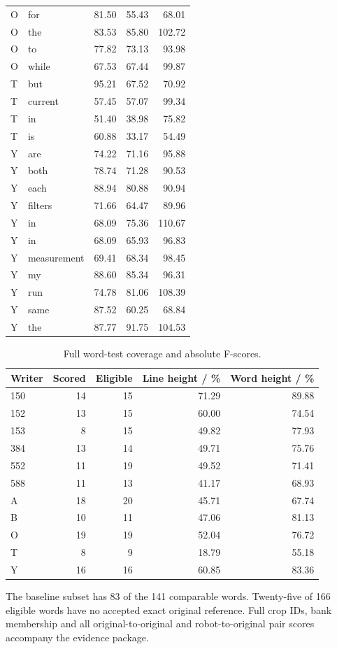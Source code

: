 \begin{longtable}{llrrr}
O & for & 81.50 & 55.43 & 68.01\\
O & the & 83.53 & 85.80 & 102.72\\
O & to & 77.82 & 73.13 & 93.98\\
O & while & 67.53 & 67.44 & 99.87\\
T & but & 95.21 & 67.52 & 70.92\\
T & current & 57.45 & 57.07 & 99.34\\
T & in & 51.40 & 38.98 & 75.82\\
T & is & 60.88 & 33.17 & 54.49\\
Y & are & 74.22 & 71.16 & 95.88\\
Y & both & 78.74 & 71.28 & 90.53\\
Y & each & 88.94 & 80.88 & 90.94\\
Y & filters & 71.66 & 64.47 & 89.96\\
Y & in & 68.09 & 75.36 & 110.67\\
Y & in & 68.09 & 65.93 & 96.83\\
Y & measurement & 69.41 & 68.34 & 98.45\\
Y & my & 88.60 & 85.34 & 96.31\\
Y & run & 74.78 & 81.06 & 108.39\\
Y & same & 87.52 & 60.25 & 68.84\\
Y & the & 87.77 & 91.75 & 104.53\\
\bottomrule\end{longtable}
\begin{table}[H]\centering\small
\begin{tabular}{lrrrr}
\toprule Writer & Scored & Eligible & Line height / \% & Word height / \%\\\midrule
150 & 14 & 15 & 71.29 & 89.88\\
152 & 13 & 15 & 60.00 & 74.54\\
153 & 8 & 15 & 49.82 & 77.93\\
384 & 13 & 14 & 49.71 & 75.76\\
552 & 11 & 19 & 49.52 & 71.41\\
588 & 11 & 13 & 41.17 & 68.93\\
A & 18 & 20 & 45.71 & 67.74\\
B & 10 & 11 & 47.06 & 81.13\\
O & 19 & 19 & 52.04 & 76.72\\
T & 8 & 9 & 18.79 & 55.18\\
Y & 16 & 16 & 60.85 & 83.36\\
\bottomrule\end{tabular}
\caption{Full word-test coverage and absolute F-scores.}\label{tab:app-geometric-coverage}\end{table}
The baseline subset has 83 of the 141 comparable words. Twenty-five of 166 eligible words have no accepted exact original reference. Full crop IDs, bank membership and all original-to-original and robot-to-original pair scores accompany the evidence package.
